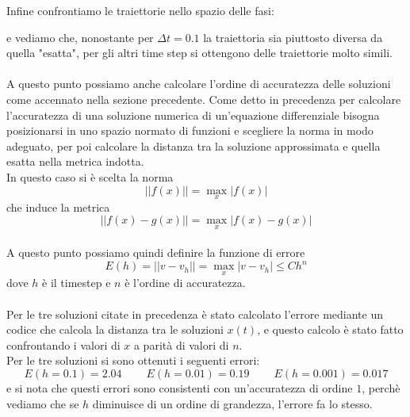 \documentclass[12pt]{article}
\begin{document}
Infine confrontiamo le traiettorie nello spazio delle fasi:
\begin{figure}[H]
	\centering
	\scalebox{0.9}{}
\end{figure}
e vediamo che, nonostante per $\Delta t = 0.1$ la traiettoria sia piuttosto diversa da quella "esatta", per gli altri time step si ottengono delle traiettorie molto simili. \\ \\
A questo punto possiamo anche calcolare l'ordine di accuratezza delle soluzioni come accennato nella sezione precedente. 
Come detto in precedenza per calcolare l'accuratezza di una soluzione numerica di un'equazione differenziale bisogna posizionarsi in uno spazio normato di funzioni e scegliere la norma in modo adeguato, per poi calcolare la distanza tra la soluzione approssimata e quella esatta nella metrica indotta. \\
In questo caso si è scelta la norma
\begin{equation}
	||f(x)|| = \max_x |f(x)|
\end{equation}
che induce la metrica
\begin{equation}
	||f(x) - g(x)|| = \max_x |f(x) - g(x)|
\end{equation} \\
A questo punto possiamo quindi definire la funzione di errore
\begin{equation}
	E(h) = ||v - v_h|| = \max_x |v - v_h| \leq Ch^n
\end{equation}
dove $h$ è il timestep e $n$ è l'ordine di accuratezza. \\ \\
Per le tre soluzioni citate in precedenza è stato calcolato l'errore mediante un codice che calcola la distanza tra le soluzioni $x(t)$, e questo calcolo è stato fatto confrontando i valori di $x$ a parità di valori di $n$. \\
Per le tre soluzioni si sono ottenuti i seguenti errori:
\begin{equation}
	E(h = 0.1) = 2.04 \ \ \ \ \ \ \ \ \ \  E(h = 0.01) = 0.19  \ \ \ \ \ \ \ \ \ \ E(h = 0.001) = 0.017
\end{equation}
e si nota che questi errori sono consistenti con un'accuratezza di ordine $1$, perchè vediamo che se $h$ diminuisce di un ordine di grandezza, l'errore fa lo stesso.
\end{document}
